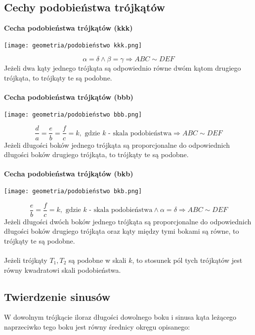\documentclass[14pt,a4paper]{extarticle}
\newcommand{\scalemath}[2][4]{\scalebox{#1}{\ensuremath{#2}}}
\begin{document}
\subsection{Cechy podobieństwa trójkątów}
\noindent \textbf{Cecha podobieństwa trójkątów (kkk)}
\begin{center}\texttt{[image: geometria/podobieństwo kkk.png]}\end{center}
$$\alpha = \delta \land \beta = \gamma \Rightarrow ABC \sim DEF$$
Jeżeli dwa kąty jednego trójkąta są odpowiednio równe dwóm kątom drugiego trójkąta, to trójkąty te są
podobne.\\\\
\noindent \textbf{Cecha podobieństwa trójkątów (bbb)}
\begin{center}\texttt{[image: geometria/podobieństwo bbb.png]}\end{center}
$$\dfrac{d}{a} = \dfrac{e}{b} = \dfrac{f}{c} = k, \text{ gdzie } k \text{ - skala podobieństwa} \Rightarrow ABC \sim DEF$$
Jeżeli długości boków jednego trójkąta są proporcjonalne do odpowiednich długości boków drugiego trójkąta,
to trójkąty te są podobne.\\\\
\noindent \textbf{Cecha podobieństwa trójkątów (bkb)}
\begin{center}\texttt{[image: geometria/podobieństwo bkb.png]}\end{center}
$$\dfrac{e}{b} = \dfrac{f}{c} = k, \text{ gdzie } k \text{ - skala podobieństwa} \land \alpha = \delta \Rightarrow ABC \sim DEF$$
Jeżeli długości dwóch boków jednego trójkąta są proporcjonalne do odpowiednich długości boków drugiego
trójkąta oraz kąty między tymi bokami są równe, to trójkąty te są podobne.\\\\
Jeżeli trójkąty $T_{1}, T_{2}$ są podobne w skali $k$, to stosunek pól tych trójkątów jest równy
kwadratowi skali podobieństwa.

\subsection{Twierdzenie sinusów}
W dowolnym trójkącie iloraz długości dowolnego boku i sinusa kąta leżącego naprzeciwko tego boku jest
równy średnicy okręgu opisanego:
\begin{center}
\scalemath[1.2]{
\makebox[\linewidth]{
   \(
      \hspace{-3cm}\dfrac{a}{\sin \alpha} = \dfrac{b}{\sin \beta} = \dfrac{c}{\sin \gamma} = 2R
   \)
}}
\end{center}
\newpage
\end{document}
